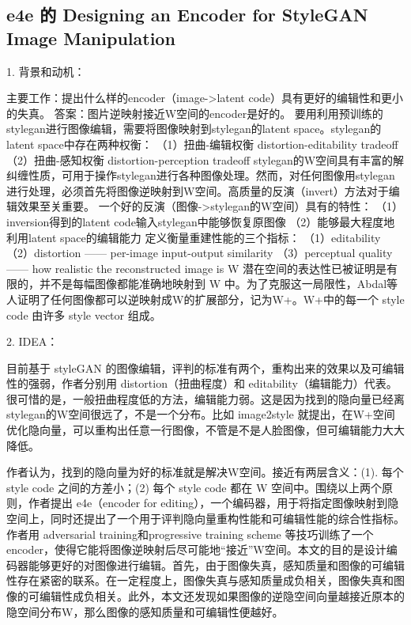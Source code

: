 \subsection{e4e 的 Designing an Encoder for StyleGAN Image Manipulation}

1. 背景和动机：

主要工作：提出什么样的encoder（image->latent code）具有更好的编辑性和更小的失真。
答案：图片逆映射接近W空间的encoder是好的。
要用利用预训练的stylegan进行图像编辑，需要将图像映射到stylegan的latent space。stylegan的latent space中存在两种权衡：
（1）扭曲-编辑权衡 distortion-editability tradeoff
（2）扭曲-感知权衡 distortion-perception tradeoff
stylegan的W空间具有丰富的解纠缠性质，可用于操作stylegan进行各种图像处理。然而，对任何图像用stylegan进行处理，必须首先将图像逆映射到W空间。高质量的反演（invert）方法对于编辑效果至关重要。
一个好的反演（图像->stylegan的W空间）具有的特性：
（1）inversion得到的latent code输入stylegan中能够恢复原图像
（2）能够最大程度地利用latent space的编辑能力
定义衡量重建性能的三个指标：
（1）editability
（2）distortion —— per-image input-output similarity
（3）perceptual quality —— how realistic the reconstructed image is
W 潜在空间的表达性已被证明是有限的，并不是每幅图像都能准确地映射到 W 中。为了克服这一局限性，Abdal等人证明了任何图像都可以逆映射成W的扩展部分，记为W+。W+中的每一个 style code 由许多 style vector 组成。

2. IDEA：

目前基于 styleGAN 的图像编辑，评判的标准有两个，重构出来的效果以及可编辑性的强弱，作者分别用 distortion（扭曲程度）和 editability（编辑能力）代表。很可惜的是，一般扭曲程度低的方法，编辑能力弱。这是因为找到的隐向量已经离stylegan的W空间很远了，不是一个分布。比如 image2style 就提出，在W+空间优化隐向量，可以重构出任意一行图像，不管是不是人脸图像，但可编辑能力大大降低。

作者认为，找到的隐向量为好的标准就是解决W空间。接近有两层含义：(1). 每个 style code 之间的方差小；(2) 每个 style code 都在 W 空间中。围绕以上两个原则，作者提出 e4e（encoder for editing），一个编码器，用于将指定图像映射到隐空间上，同时还提出了一个用于评判隐向量重构性能和可编辑性能的综合性指标。作者用 adversarial training和progressive training scheme 等技巧训练了一个 encoder，使得它能将图像逆映射后尽可能地“接近”W空间。本文的目的是设计编码器能够更好的对图像进行编辑。首先，由于图像失真，感知质量和图像的可编辑性存在紧密的联系。在一定程度上，图像失真与感知质量成负相关，图像失真和图像的可编辑性成负相关。此外，本文还发现如果图像的逆隐空间向量越接近原本的隐空间分布W，那么图像的感知质量和可编辑性便越好。


